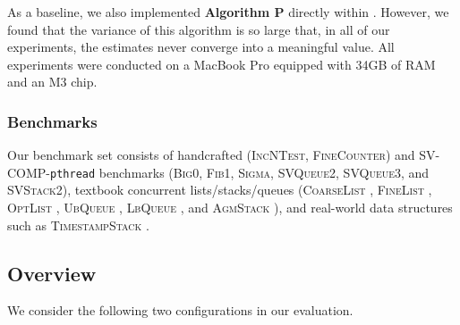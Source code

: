 As a baseline, we also implemented \textbf{Algorithm P} directly within \jmc.
However, we found that the variance of this algorithm is so large that, in all of our experiments, the estimates never converge into a meaningful value.
All experiments were conducted on a MacBook Pro equipped with 34GB of RAM and an M3 chip.

\subsubsection*{Benchmarks}
Our benchmark set consists of handcrafted (\textsc{IncNTest}, \textsc{FineCounter}) and SV-COMP-\texttt{pthread} \cite{svcomp} benchmarks (\textsc{Big0}, \textsc{Fib1}, \textsc{Sigma}, \textsc{SVQueue2}, \textsc{SVQueue3}, and \textsc{SVStack2}),
  textbook concurrent lists/stacks/queues (\textsc{CoarseList} \cite{book:herlihy-shavit}, \textsc{FineList} \cite{finelist}, \textsc{OptList} \cite{book:herlihy-shavit}, \textsc{UbQueue} \cite{book:herlihy-shavit}, 
  \textsc{LbQueue} \cite{book:herlihy-shavit}, and \textsc{AgmStack} \cite{agmstack}), and real-world data structures such as \textsc{TimestampStack} \cite{timestamped-stack}.



\subsection{Overview }
We consider the following two configurations in our evaluation.

